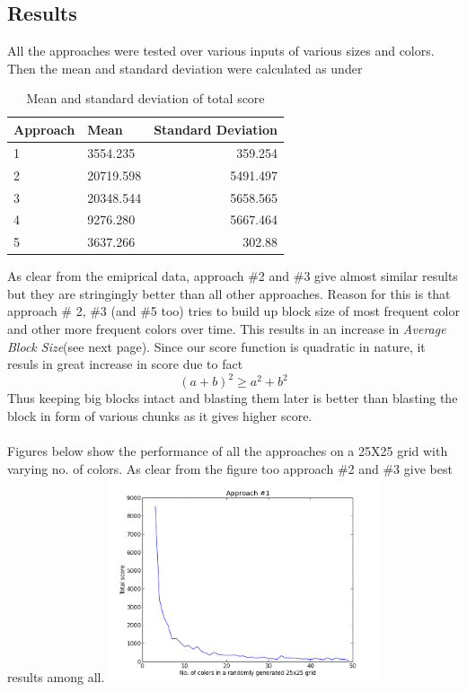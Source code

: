 \documentclass[twoside]{article}
\begin{document}
\begin{multicols}{2}
\section{Results}
All the approaches were tested over various inputs of various sizes and colors. Then the mean and standard deviation were calculated as under
\begin{table}[H]
\caption{Mean and standard deviation of total score}
\centering
\begin{tabular}{llr}
\toprule
Approach & Mean & Standard Deviation\\
\midrule
1 & 3554.235 & 359.254 \\
2 & 20719.598 & 5491.497\\
3 & 20348.544 & 5658.565\\
4 & 9276.280 & 5667.464\\
5 & 3637.266 & 302.88\\
\bottomrule
\end{tabular}
\end{table}
As clear from the emiprical data, approach \#2 and \#3 give almost similar results but they are stringingly better than all other approaches. Reason for this is that approach \# 2, \#3 (and \#5 too) tries to build up block size of most frequent color and other more frequent colors over time. This results in an increase in \textit{Average Block Size}(see next page). Since our
 score function is quadratic in nature, it resuls in great increase in score due to fact
\begin{equation}
\label{eq:emc}
(a+b)^{2} \geq a^{2} + b^{2} 
\end{equation}
Thus keeping big blocks intact and blasting them later is better than blasting the block in form of various chunks as it gives higher score.\\\\
Figures below show the performance of all the approaches on a 25X25 grid with varying no. of colors. As clear from the figure too approach \#2 and \#3 give best results among all.
\includegraphics[width=8cm]{figure_3.png}

\end{multicols}
\end{document}
